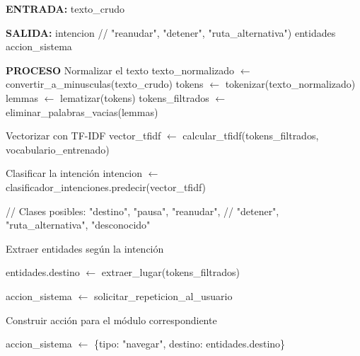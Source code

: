 \begin{algorithmic}[1]

\Statex \textbf{ENTRADA:}
\State texto\_crudo 

\Statex
\Statex \textbf{SALIDA:}
\Statex intencion 
\Statex \hspace{1.55cm} // "reanudar", "detener", "ruta\_alternativa")
\Statex entidades 
\Statex accion\_sistema 

\Statex
\Statex \textbf{PROCESO}
\State Normalizar el texto
\State texto\_normalizado $\gets$ convertir\_a\_minusculas(texto\_crudo)
\State tokens $\gets$ tokenizar(texto\_normalizado)
\State lemmas $\gets$ lematizar(tokens) 
\State tokens\_filtrados $\gets$ eliminar\_palabras\_vacias(lemmas)

\Statex
\State Vectorizar con TF-IDF
\State vector\_tfidf $\gets$ calcular\_tfidf(tokens\_filtrados, vocabulario\_entrenado)

\Statex
\State Clasificar la intención
\State intencion $\gets$ clasificador\_intenciones.predecir(vector\_tfidf)

\Statex \hspace{0.5cm} // Clases posibles: "destino", "pausa", "reanudar",
\Statex \hspace{0.5cm} // "detener", "ruta\_alternativa", "desconocido"

\Statex
\State Extraer entidades según la intención


    \State entidades.destino $\gets$ extraer\_lugar(tokens\_filtrados)

\EndIf

\Statex


    \State accion\_sistema $\gets$ solicitar\_repeticion\_al\_usuario
    \State \Return

\EndIf

\Statex
\State Construir acción para el módulo correspondiente


    \State accion\_sistema $\gets$ \{tipo: "navegar", destino: entidades.destino\}

\EndIf

\Statex


\end{algorithmic}
